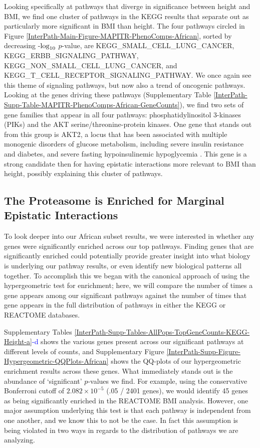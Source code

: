 \documentclass[12pt,a4paper]{article}
\def\log{{\rm log}}
\begin{document}
Looking specifically at pathways that diverge in significance between height and BMI, we find one cluster of pathways in the KEGG results that separate out as particularly more significant in BMI than height. The four pathways circled in Figure \ref{InterPath-Main-Figure-MAPITR-PhenoComps-African}, sorted by decreasing -$\log_{10}$ $p$-value, are KEGG\_SMALL\_CELL\_LUNG\_CANCER, KEGG\_ERBB\_SIGNALING\_PATHWAY, KEGG\_NON\_SMALL\_CELL\_LUNG\_CANCER, and KEGG\_T\_CELL\_RECEPTOR\_SIGNALING\_PATHWAY. We once again see this theme of signaling pathways, but now also a trend of oncogenic pathways. Looking at the genes driving these pathways (Supplementary Table \ref{InterPath-Supp-Table-MAPITR-PhenoComps-African-GeneCounts}), we find two sets of gene families that appear in all four pathways: phosphatidylinositol 3-kinases (PIKs) and the AKT serine/threonine-protein kinases. One gene that stands out from this group is AKT2, a locus that has been associated with multiple monogenic disorders of glucose metabolism, including severe insulin resistance and diabetes, and severe fasting hypoinsulinemic hypoglycemia \citep{George2004,Manning2017,Latva-Rasku2018}. This gene is a strong candidate then for having epistatic interactions more relevant to BMI than height, possibly explaining this cluster of pathways.       

\subsection{The Proteasome is Enriched for Marginal Epistatic Interactions}

To look deeper into our African subset results, we were interested in whether any genes were significantly enriched across our top pathways. Finding genes that are significantly enriched could potentially provide greater insight into what biology is underlying our pathway results, or even identify new biological patterns all together. To accomplish this we began with the canonical approach of using the hypergeometric test for enrichment; here, we will compare the number of times a gene appears among our significant pathways against the number of times that gene appears in the full distribution of pathways in either the KEGG or REACTOME databases. 

Supplementary Tables \ref{InterPath-Supp-Tables-AllPops-TopGeneCounts-KEGG-Height-a}\textcolor{blue}{-d} shows the various genes present across our significant pathways at different levels of counts, and Supplementary Figure \ref{InterPath-Supp-Figure-Hypergeometric-QQPlots-African} shows the QQ-plots of our hypergeometric enrichment results across these genes. What immediately stands out is the abundance of `significant' $p$-values we find. For example, using the conservative Bonferroni cutoff of $2.082\times10^{-5}$ (.05 / 2401 genes), we would identify 45 genes as being significantly enriched in the REACTOME BMI analysis. However, one major assumption underlying this test is that each pathway is independent from one another, and we know this to not be the case. In fact this assumption is being violated in two ways in regards to the distribution of pathways we are analyzing. 
\end{document}
